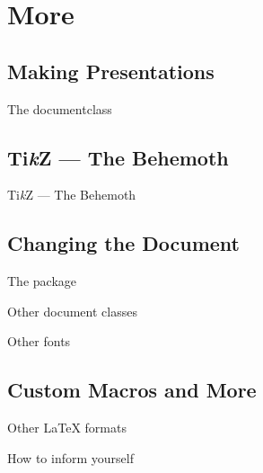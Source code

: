 \section{More}

\subsection{Making Presentations}
\begin{frame}{The  documentclass}

\end{frame}

\subsection{Ti\textit{k}Z --- The Behemoth}
\begin{frame}{Ti\textit{k}Z --- The Behemoth}

\end{frame}

\subsection{Changing the Document}
\begin{frame}{The  package}

\end{frame}

\begin{frame}{Other document classes}

\end{frame}

\begin{frame}{Other fonts}

\end{frame}

\subsection{Custom Macros and More}
\begin{frame}

\end{frame}

\begin{frame}{Other \LaTeX{} formats}

\end{frame}

\begin{frame}{How to inform yourself}

\end{frame}
